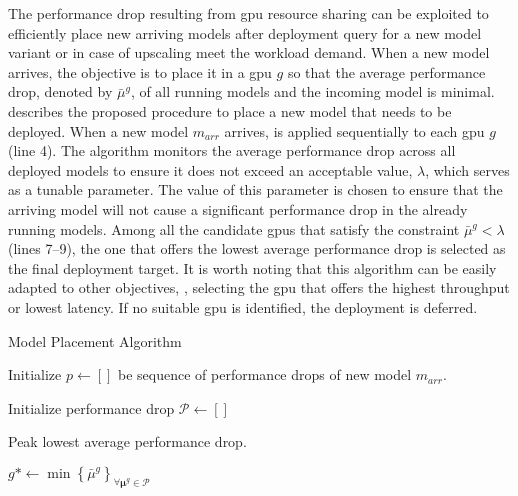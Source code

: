 The performance drop resulting from \acrshort{gpu} resource sharing can be exploited to efficiently place new arriving models after deployment query for a new model variant or in case of upscaling meet the workload demand.
When a new model arrives, the objective is to place it in a \acrshort{gpu} $g$ so that the average performance drop, denoted by $\bar{\mu}^g$, of all running models and the incoming model is minimal.  describes the proposed procedure to place a new model that needs to be deployed. When a new model $m_{arr}$ arrives,  is applied sequentially to each \acrshort{gpu} $g$ (line 4). The algorithm monitors the average performance drop across all deployed models to ensure it does not exceed an acceptable value, $\lambda$, which serves as a tunable parameter. The value of this parameter is chosen to ensure that the arriving model will not cause a significant performance drop in the already running models. Among all the candidate \acrshort{gpu}s that satisfy the constraint $\bar{\mu}^g < \lambda$ (lines 7--9), the one that offers the lowest average performance drop is selected as the final deployment target. It is worth noting that this algorithm can be easily adapted to other objectives, \eg, selecting the \acrshort{gpu} that offers the highest throughput or lowest latency. If no suitable \acrshort{gpu} is identified, the deployment is deferred.

\begin{algorithm}[t]
	\caption{Model Placement Algorithm}
	\label{algo:model_placement}
	\SetAlgoLined
	{
		\begin{small}
			Initialize $p \gets []$ be sequence of performance drops of new model $m_{arr}$.

			Initialize performance drop $\mathcal{P} \gets []$




			Peak lowest average performance drop.

			$g* \gets \min \left\{ \bar{\mu}^g \right\}_{\forall \mathbf{\mu}^g \in \mathcal{P}}$

		\end{small}
	}
\end{algorithm}